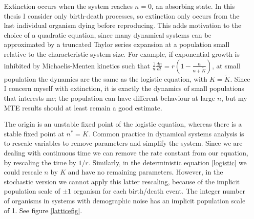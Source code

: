 Extinction occurs when the system reaches $n=0$, an absorbing state. %
In this thesis I consider only birth-death processes, so extinction only occurs from the last individual organism dying before reproducing. %
This adds motivation to the choice of a quadratic equation, since many dynamical systems can be approximated by a truncated Taylor series expansion at a population small relative to the characteristic system size. 
For example, if exponential growth is inhibited by Michaelis-Menten kinetics such that $\frac{1}{n}\frac{dn}{dt} = r\left(1-\frac{n}{n+\tilde{K}}\right)$, at small population the dynamics are the same as the logistic equation, with $K=\tilde{K}$. 
Since I concern myself with extinction, it is exactly the dynamics of small populations that interests me; the population can have different behaviour at large $n$, but my MTE results should at least remain a good estimate. %

The origin is an unstable fixed point of the logistic equation, whereas there is a stable fixed point at $n^*=K$. 
Common practice in dynamical systems analysis is to rescale variables to remove parameters and simplify the system. 
Since we are dealing with continuous time we can remove the rate constant from our equation, by rescaling the time by $1/r$. 
Similarly, in the deterministic equation \ref{logistic} we could rescale $n$ by $K$ and have no remaining parameters. 
However, in the stochastic version we cannot apply this latter rescaling, because of the implicit population scale of $\pm1$ organism for each birth/death event. 
The integer number of organisms in systems with demographic noise has an implicit population scale of 1. 
See figure \ref{latticefig}. 

